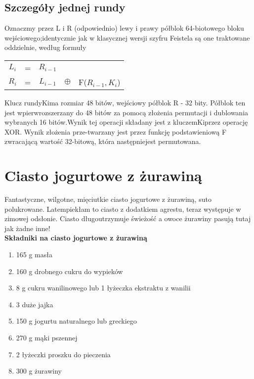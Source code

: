 \documentclass[12pt, a4paper, titlepage]{article}
\begin{document}
\subsection{Szczegóły jednej rundy}
Oznaczmy przez L i R (odpowiednio) lewy i prawy półblok 64-biotowego bloku wejściowego;identycznie jak w klasycznej wersji szyfru Feistela są one traktowane oddzielnie, według formuły

\begin{table}[h]
\centering
\begin{tabular}{c c c c c}

$L_i$ & = & $R_{i-1}$\\
$R_i$ & = & $L_{i-1}$ & $\oplus$ & F($R_{i-1}, K_i$)\\
 
\end{tabular}
\end{table}

\noindent Klucz rundyKima rozmiar 48 bitów, wejściowy półblok R - 32 bity. Półblok ten jest wpierwrozszerzany do 48 bitów za pomocą złożenia permutacji i dublowania wybranych 16 bitów.Wynik tej operacji składany jest z kluczemKiprzez operację XOR. Wynik złożenia prze-twarzany jest przez funkcję podstawieniową F zwracającą wartość 32-bitową, która następniejest permutowana.

\newpage

\section{Ciasto jogurtowe z żurawiną}
Fantastyczne, wilgotne, mięciutkie ciasto jogurtowe z żurawiną, suto polukrowane. Latempiekłam to ciasto z dodatkiem agrestu, teraz występuje w zimowej odsłonie. Ciasto długoutrzymuje świeżość a owoce żurawiny pasują tutaj jak żadne inne!\cite{3}
\\

\noindent\textbf{Składniki na ciasto jogurtowe z żurawiną}
\begin{enumerate}[1.]
\item 165 g masła
\item 160 g drobnego cukru do wypieków
\item 8 g cukru wanilinowego lub 1 łyżeczka ekstraktu z wanilii
\item 3 duże jajka
\item 150 g jogurtu naturalnego lub greckiego
\item 270 g mąki pszennej
\item 2 łyżeczki proszku do pieczenia
\item 300 g żurawiny
\end{enumerate}
\end{document}
